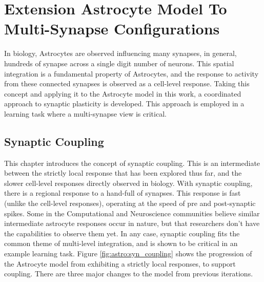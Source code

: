 \chapter{Extension Astrocyte Model To Multi-Synapse
  Configurations} \label{chapter:obj3}

In biology, Astrocytes are observed influencing many synapses, in general,
hundreds of synapse across a single digit number of neurons. This spatial
integration is a fundamental property of Astrocytes, and the response to
activity from these connected synapses is observed as a cell-level \ca
response. Taking this concept and applying it to the Astrocyte model
in this work, a coordinated approach to synaptic plasticity is developed. This
approach is employed in a learning task where a multi-synapse view is critical.



  

\section{Synaptic Coupling}
This chapter introduces the concept of synaptic coupling. This is an
intermediate between the strictly local response that has been explored thus
far, and the slower cell-level responses directly observed in biology. With
synaptic coupling, there is a regional response to a hand-full of synapses.
This response is fast (unlike the cell-level \ca responses), operating at the
speed of pre and post-synaptic spikes. Some in the Computational and
Neuroscience communities believe similar intermediate astrocyte responses occur
in nature, but that researchers don't have the capabilities to observe them
yet. In any case, synaptic coupling fits the common theme of multi-level
integration, and is shown to be critical in an example learning task. Figure
\ref{fig:astro:syn_coupling} shows the progression of the Astrocyte model from
exhibiting a strictly local responses, to support coupling. There are three
major changes to the model from previous iterations.

